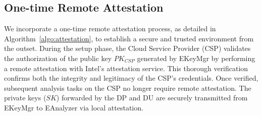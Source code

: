 \subsection{One-time Remote Attestation}
We incorporate a one-time remote attestation process, as detailed in Algorithm \ref{algo:attestation}, to establish a secure and trusted environment from the outset. 
During the setup phase, the Cloud Service Provider (CSP) validates the authorization of the public key $PK_{CSP}$ generated by EKeyMgr by performing a remote attestation with Intel’s attestation service. This thorough verification confirms both the integrity and legitimacy of the CSP’s credentials.
Once verified, subsequent analysis tasks on the CSP no longer require remote attestation. The private keys ($SK$) forwarded by the DP and DU are securely transmitted from EKeyMgr to EAnalyzer via local attestation.
